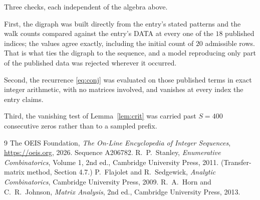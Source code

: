 \documentclass[11pt,a4paper]{article}
\theoremstyle{plain}
\theoremstyle{definition}
\begin{document}
Three checks, each independent of the algebra above.

First, the digraph was built directly from the entry's stated patterns and the walk counts
compared against the entry's DATA at every one of the $18$ published indices; the
values agree exactly, including the initial count of $20$ admissible rows. That is
what ties the digraph to the sequence, and a model reproducing only part of the published
data was rejected wherever it occurred.

Second, the recurrence \eqref{eq:conj} was evaluated on those published terms in exact
integer arithmetic, with no matrices involved, and vanishes at every index the entry claims.

Third, the vanishing test of Lemma~\ref{lem:crit} was carried past $S=400$ consecutive
zeros rather than to a sampled prefix.

\begin{thebibliography}{9}
 The OEIS Foundation, \emph{The On-Line Encyclopedia of Integer
Sequences}, \url{https://oeis.org}, 2026. Sequence A206782.
 R.~P.~Stanley, \emph{Enumerative Combinatorics}, Volume 1, 2nd ed.,
Cambridge University Press, 2011. (Transfer-matrix method, Section 4.7.)
 P.~Flajolet and R.~Sedgewick, \emph{Analytic Combinatorics}, Cambridge
University Press, 2009.
 R.~A.~Horn and C.~R.~Johnson, \emph{Matrix Analysis}, 2nd ed., Cambridge
University Press, 2013.
\end{thebibliography}
\end{document}
